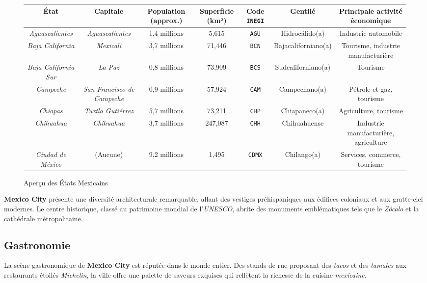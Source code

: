 \documentclass[12pt, a4paper]{article}
\begin{document}
\begin{figure}[h!]
    \centering
    \begin{tabular}{|c|c|c|c|c|c|c|}
        \hline
        \textbf{\'{E}tat} & \textbf{Capitale} & \textbf{Population (approx.)} & \textbf{Superficie (km²)} & \textbf{Code \texttt{INEGI}} & \textbf{Gentil\'{e}} & \textbf{Principale activit\'{e} \'{e}conomique} \\
        \hline
        \textit{Aguascalientes} & \textit{Aguascalientes} & 1,4 millions & 5,615 & \texttt{AGU} & Hidroc\'{a}lido(a) & Industrie automobile \\
        \textit{Baja California} & \textit{Mexicali} & 3,7 millions & 71,446 & \texttt{BCN} & Bajacaliforniano(a) & Tourisme, industrie manufacturière \\
        \textit{Baja California Sur} & \textit{La Paz} & 0,8 millions & 73,909 & \texttt{BCS} & Sudcaliforniano(a) & Tourisme \\
        \textit{Campeche} & \textit{San Francisco de Campeche} & 0,9 millions & 57,924 & \texttt{CAM} & Campechano(a) & P\'{e}trole et gaz, tourisme \\
        \textit{Chiapas} & \textit{Tuxtla Guti\'{e}rrez} & 5,7 millions & 73,211 & \texttt{CHP} & Chiapaneco(a) & Agriculture, tourisme \\
        \textit{Chihuahua} & \textit{Chihuahua} & 3,7 millions & 247,087 & \texttt{CHH} & Chihuahuense & Industrie manufacturière, agriculture \\
        \textit{Ciudad de M\'{e}xico} & (Aucune) & 9,2 millions & 1,495 & \texttt{CDMX} & Chilango(a) & Services, commerce, tourisme \\
        \hline
    \end{tabular}
    \caption{Aper\c{c}u des \'{E}tats Mexicains}
    \label{tab:etats_mexicains}
\end{figure}
    
\textbf{Mexico City} présente une diversité architecturale remarquable, allant des vestiges préhispaniques aux édifices coloniaux et aux gratte-ciel modernes. Le centre historique, classé au patrimoine mondial de l'\textit{UNESCO}, abrite des monuments emblématiques tels que le \textit{Zócalo} et la cathédrale métropolitaine.

\subsection*{\textbf{Gastronomie}}

La scène gastronomique de \textbf{Mexico City} est réputée dans le monde entier. Des stands de rue proposant des \textit{tacos} et des \textit{tamales} aux restaurants étoilés \textit{Michelin}, la ville offre une palette de saveurs exquises qui reflètent la richesse de la cuisine \textit{mexicaine}.
\end{document}
